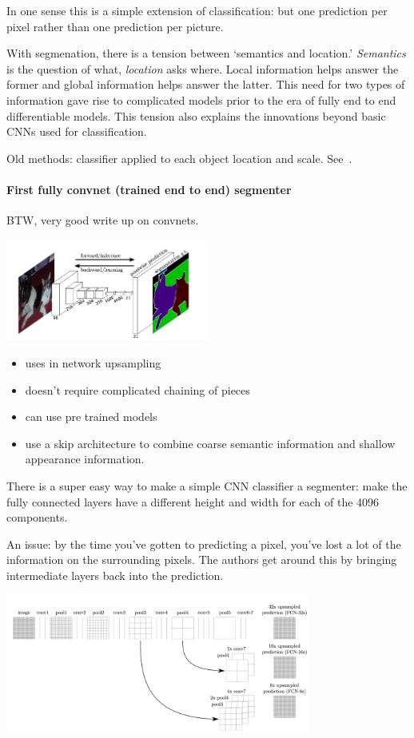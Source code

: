 \documentclass[12pt, a4paper, oneside, headinclude, footinclude]{article}
\begin{document}
In one sense this is a simple extension of classification: but one prediction
per pixel rather than one prediction per picture.

With segmenation, there is a tension between `semantics and location.'
\textit{Semantics} is the question of what, \textit{location} asks where.
Local information helps answer the former and global information helps answer
the latter. This need for two types of information gave rise to complicated
models prior to the era of fully end to end differentiable models. This
tension also explains the innovations beyond basic CNNs used for
classification.

Old methods: classifier applied to each object location and scale.
See~\cite{NIPS2015_5852}.

\paragraph{First fully convnet (trained end to end) segmenter}

BTW, very good write up on convnets.~\cite{long2015fully}

\includegraphics[width=0.5\textwidth]{Figures/long-segmentation.png}
\begin{itemize}
    \item uses in network upsampling
    \item doesn't require complicated chaining of pieces
    \item can use pre trained models
    \item use a skip architecture to combine coarse semantic information and shallow
appearance information.
\end{itemize}
There is a super easy way to make a simple CNN classifier a segmenter: make
the fully connected layers have a different height and width for each of the
4096 components.

An issue: by the time you've gotten to predicting a pixel, you've lost a lot
of the information on the surrounding pixels. The authors get around this by
bringing intermediate layers back into the prediction.

\includegraphics[width=0.75\textwidth]{Figures/skip-segmentation.png}
\end{document}
